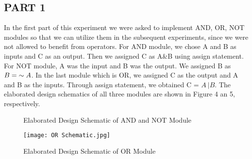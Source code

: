\documentclass[pdftex,12pt,a4paper]{article}
\begin{document}
\subsection{PART 1}
In the first part of this experiment we were asked to implement AND, OR, NOT modules so that we can utilize them in the subsequent experiments, since we were not allowed to benefit from operators. For AND module, we chose A and B as inputs and C as an output. Then we assigned C as A\&B using assign statement. For NOT module, A was the input and B was the output. We assigned B as \(B = \hspace{1mm}\sim{A}\). In the last module which is OR, we assigned C as the output and A and B as the inputs. Through assign statement, we obtained C = \(A \ | B\). The elaborated design schematics of all three modules are shown in Figure 4 an 5, respectively.

\begin{figure}%
    \centering
    \caption{Elaborated Design Schematic of AND and NOT Module}%
    \label{fig:example}%
\end{figure}
\begin{figure}[ht]
	\centering
	\texttt{[image: OR Schematic.jpg]}	
	\caption{Elaborated Design Schematic of OR Module}
	\label{fig1}
\end{figure}
\end{document}
